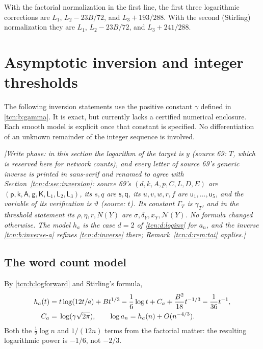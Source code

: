 \documentclass[11pt,letterpaper]{article}
\newcommand{\ee}{\mathrm e}
\theoremstyle{remark}
\begin{document}
With the factorial normalization in the first line, the first three
logarithmic corrections are \(L_1\), \(L_2-23B/72\), and
\(L_3+193/288\). With the second (Stirling) normalization they are
\(L_1\), \(L_2-23B/72\), and \(L_3+241/288\).

\section{Asymptotic inversion and integer thresholds}\label{tcn:b:sec:inversion}
The following inversion statements use the positive constant $\gamma$ defined in \eqref{tcn:b:gamma}. It is exact, but currently lacks a certified numerical enclosure. Each smooth model is explicit once that constant is specified. No differentiation of an unknown remainder of the integer sequence is involved.

\emph{[Write phase: in this section the logarithm of the target is $y$ (source 69: $T$, which is reserved here for network counts), and every letter of source 69's generic inverse is printed in sans-serif and renamed to agree with Section~\ref{tcn:d:sec:inversion}: source 69's $(d,k,A,p,C,L,D,E)$ are $(\mathsf p,\mathsf k,\mathsf A,\mathsf g,\mathsf K,\mathsf L_1,\mathsf L_2,\mathsf L_3)$, its $s,q$ are $\mathsf s,\mathsf q$, its $u,v,w,r,f$ are $\mathsf u_1,\dots,\mathsf u_5$, and the variable of its verification is $\vartheta$ (source: $t$). Its constant $\Gamma_T$ is $\gamma_T$, and in the threshold statement its $\rho,\eta,r,N(Y)$ are $\sigma,\delta_Y,x_Y,\mathcal N(Y)$. No formula changed otherwise. The model $h_a$ is the case $d=2$ of \eqref{tcn:d:loginv} for $a_n$, and the inverse \eqref{tcn:b:inverse-a} refines \eqref{tcn:d:inverse} there; Remark~\ref{tcn:d:rem:tai} applies.]}

\subsection{The word count model}
By \eqref{tcn:b:logforward} and Stirling's formula,
\begin{align}
 h_a(t)={}&t\log(12t/\ee)+Bt^{1/3}-\frac16\log t+C_a
          +\frac{B^2}{18}t^{-1/3}-\frac1{36}t^{-1},\notag\\
 C_a={}&\log(\gamma\sqrt{2\pi}),\qquad
 \log a_n=h_a(n)+O(n^{-4/3}).                              \label{tcn:b:ha}
\end{align}
Both the $\tfrac12\log n$ and $1/(12n)$ terms from the factorial matter: the resulting logarithmic power is $-1/6$, not $-2/3$.
\end{document}
